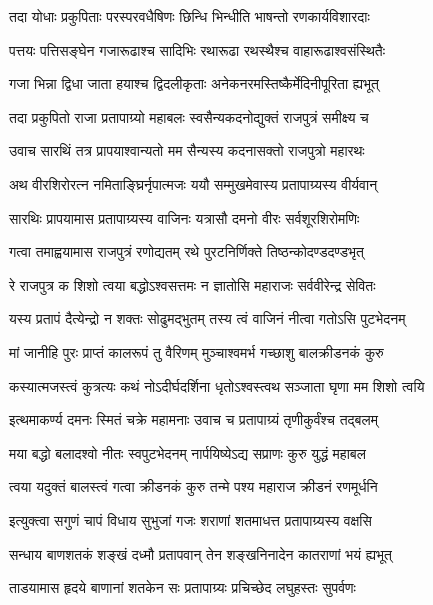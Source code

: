 \twolineshloka
{तदा योधाः प्रकुपिताः परस्परवधैषिणः}
{छिन्धि भिन्धीति भाषन्तो रणकार्यविशारदाः}%

\twolineshloka
{पत्तयः पत्तिसङ्घेन गजारूढाश्च सादिभिः}
{रथारूढा रथस्थैश्च वाहारूढाश्वसंस्थितैः}%

\twolineshloka
{गजा भिन्ना द्विधा जाता हयाश्च द्विदलीकृताः}
{अनेकनरमस्तिष्कैर्मेदिनीपूरिता ह्यभूत्}%

\twolineshloka
{तदा प्रकुपितो राजा प्रतापाग्र्यो महाबलः}
{स्वसैन्यकदनोद्युक्तं राजपुत्रं समीक्ष्य च}%

\twolineshloka
{उवाच सारथिं तत्र प्रापयाश्वान्यतो मम}
{सैन्यस्य कदनासक्तो राजपुत्रो महारथः}%

\twolineshloka
{अथ वीरशिरोरत्न नमिताङ्घ्रिर्नृपात्मजः}
{ययौ सम्मुखमेवास्य प्रतापाग्र्यस्य वीर्यवान्}%

\twolineshloka
{सारथिः प्रापयामास प्रतापाग्र्यस्य वाजिनः}
{यत्रासौ दमनो वीरः सर्वशूरशिरोमणिः}%

\twolineshloka
{गत्वा तमाह्वयामास राजपुत्रं रणोद्यतम्}
{रथे पुरटनिर्णिक्ते तिष्ठन्कोदण्डदण्डभृत्}%

\twolineshloka
{रे राजपुत्र क शिशो त्वया बद्धोऽश्वसत्तमः}
{न ज्ञातोसि महाराजः सर्ववीरेन्द्र सेवितः}%

\twolineshloka
{यस्य प्रतापं दैत्येन्द्रो न शक्तः सोढुमद्भुतम्}
{तस्य त्वं वाजिनं नीत्वा गतोऽसि पुटभेदनम्}%

\twolineshloka
{मां जानीहि पुरः प्राप्तं कालरूपं तु वैरिणम्}
{मुञ्चाश्वमर्भ गच्छाशु बालक्रीडनकं कुरु}%

\twolineshloka
{कस्यात्मजस्त्वं कुत्रत्यः कथं नोऽदीर्घदर्शिना}
{धृतोऽश्वस्त्वथ सञ्जाता घृणा मम शिशो त्वयि}%

\twolineshloka
{इत्थमाकर्ण्य दमनः स्मितं चक्रे महामनाः}
{उवाच च प्रतापाग्र्यं तृणीकुर्वंश्च तद्बलम्}%


\twolineshloka
{मया बद्धो बलादश्वो नीतः स्वपुटभेदनम्}
{नार्पयिष्येऽद्य सप्राणः कुरु युद्धं महाबल}%

\twolineshloka
{त्वया यदुक्तं बालस्त्वं गत्वा क्रीडनकं कुरु}
{तन्मे पश्य महाराज क्रीडनं रणमूर्धनि}%


\twolineshloka
{इत्युक्त्वा सगुणं चापं विधाय सुभुजां गजः}
{शराणां शतमाधत्त प्रतापाग्र्यस्य वक्षसि}%

\twolineshloka
{सन्धाय बाणशतकं शङ्खं दध्मौ प्रतापवान्}
{तेन शङ्खनिनादेन कातराणां भयं ह्यभूत्}%

\twolineshloka
{ताडयामास हृदये बाणानां शतकेन सः}
{प्रतापाग्र्यः प्रचिच्छेद लघुहस्तः सुपर्वणः}%

